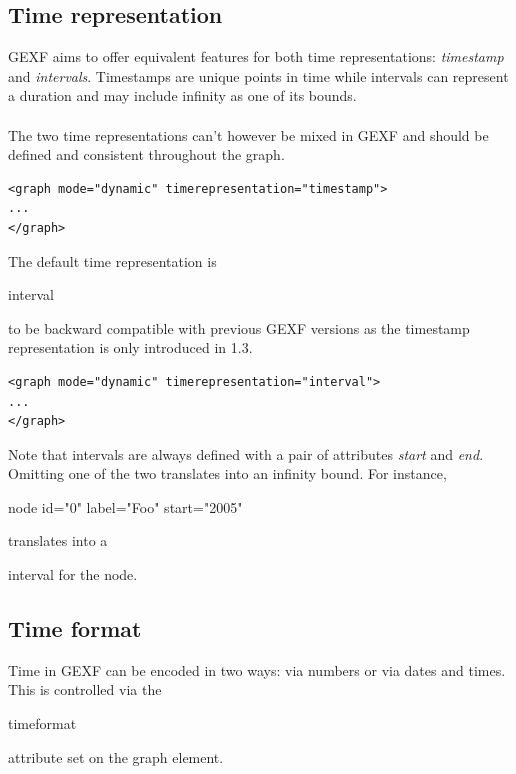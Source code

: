 \documentclass[a4paper,10pt]{article}
\begin{document}
\subsection{Time representation}

GEXF aims to offer equivalent features for both time representations: \textit{timestamp} and \textit{intervals}. Timestamps are unique points in time while intervals can represent a duration and may include infinity as one of its bounds.

\paragraph{}
The two time representations can't however be mixed in GEXF and should be defined and consistent throughout the graph.

\lstset{ style=gexf }
\begin{lstlisting}[caption={Timestamp Time Representation}]
<graph mode="dynamic" timerepresentation="timestamp">
...
</graph>
\end{lstlisting}

The default time representation is \begin{footnotesize}interval\end{footnotesize} to be backward compatible with previous GEXF versions as the timestamp representation is only introduced in 1.3.

\lstset{ style=gexf }
\begin{lstlisting}[caption={Interval Time Representation}]
<graph mode="dynamic" timerepresentation="interval">
...
</graph>
\end{lstlisting}

Note that intervals are always defined with a pair of attributes \textit{start} and \textit{end}. Omitting one of the two translates into an infinity bound. For instance, \begin{footnotesize}node id="0" label="Foo" start="2005"\end{footnotesize} translates into a \begin{footnotesize}[2005, +INF]\end{footnotesize} interval for the node.

\subsection{Time format}

Time in GEXF can be encoded in two ways: via numbers or via dates and times. This is controlled via the \begin{footnotesize}timeformat\end{footnotesize} attribute set on the graph element.
\end{document}
